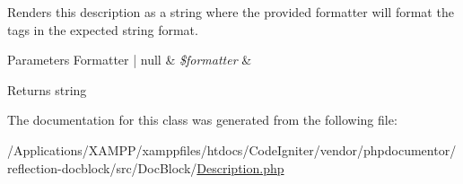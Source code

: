 Renders this description as a string where the provided formatter will format the tags in the expected string format.


\begin{DoxyParams}[1]{Parameters}
Formatter | null & {\em \$formatter} & \\
\hline
\end{DoxyParams}
\begin{DoxyReturn}{Returns}
string 
\end{DoxyReturn}


The documentation for this class was generated from the following file\+:\begin{DoxyCompactItemize}
\item 
/\+Applications/\+X\+A\+M\+P\+P/xamppfiles/htdocs/\+Code\+Igniter/vendor/phpdocumentor/reflection-\/docblock/src/\+Doc\+Block/\mbox{\hyperlink{_description_8php}{Description.\+php}}\end{DoxyCompactItemize}

